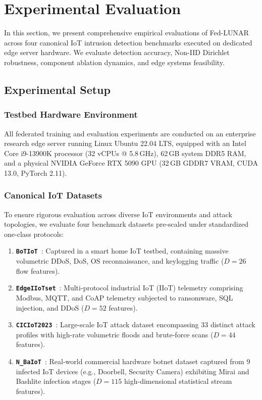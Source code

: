 
\section{Experimental Evaluation}
\label{sec:experiments}

In this section, we present comprehensive empirical evaluations of Fed-LUNAR across four canonical IoT intrusion detection benchmarks executed on dedicated edge server hardware. We evaluate detection accuracy, Non-IID Dirichlet robustness, component ablation dynamics, and edge systems feasibility.

\subsection{Experimental Setup}
\label{subsec:exp_setup}

\subsubsection{Testbed Hardware Environment}
All federated training and evaluation experiments are conducted on an enterprise research edge server running Linux Ubuntu 22.04 LTS, equipped with an Intel Core i9-13900K processor (32 vCPUs @ 5.8\,GHz), 62\,GB system DDR5 RAM, and a physical NVIDIA GeForce RTX 5090 GPU (32\,GB GDDR7 VRAM, CUDA 13.0, PyTorch 2.11).

\subsubsection{Canonical IoT Datasets}
To ensure rigorous evaluation across diverse IoT environments and attack topologies, we evaluate four benchmark datasets pre-scaled under standardized one-class protocols:
\begin{enumerate}
    \item \textbf{\texttt{BoTIoT}}~\cite{neto2023botiot}: Captured in a smart home IoT testbed, containing massive volumetric DDoS, DoS, OS reconnaissance, and keylogging traffic ($D = 26$ flow features).
    \item \textbf{\texttt{EdgeIIoTset}}~\cite{ferrag2022edgeiiotset}: Multi-protocol industrial IoT (IIoT) telemetry comprising Modbus, MQTT, and CoAP telemetry subjected to ransomware, SQL injection, and DDoS ($D = 52$ features).
    \item \textbf{\texttt{CICIoT2023}}~\cite{neto2023ciciot2023}: Large-scale IoT attack dataset encompassing 33 distinct attack profiles with high-rate volumetric floods and brute-force scans ($D = 44$ features).
    \item \textbf{\texttt{N\_BaIoT}}~\cite{meidan2018nbiot}: Real-world commercial hardware botnet dataset captured from 9 infected IoT devices (e.g., Doorbell, Security Camera) exhibiting Mirai and Bashlite infection stages ($D = 115$ high-dimensional statistical stream features).
\end{enumerate}

